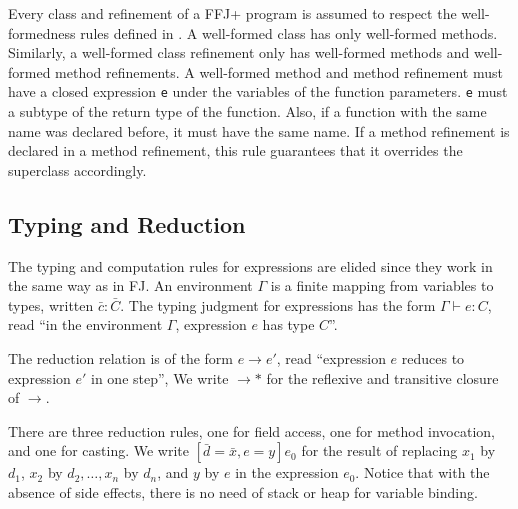 Every class and refinement of a \gls{FFJ+} program is assumed to respect the well-formedness rules
defined in .
A well-formed class has only well-formed methods. Similarly, a well-formed class refinement
only has well-formed methods and well-formed method refinements.
A well-formed method and method refinement must have a closed expression \texttt{e} under 
the variables of the function parameters. \texttt{e} must a subtype of the return
type of the function. Also, if a function with the same name was declared before, 
it must have the same name. If a method refinement is declared in a method refinement,
this rule guarantees that it overrides the superclass accordingly.

\subsection{Typing and Reduction}
The typing and computation rules for expressions are elided since they work in the same way as in \ac{FJ}. 
An environment $\Gamma$ is a finite mapping from variables to types, written $\bar{c}:\bar{C}$.
The typing judgment for expressions has the form $\Gamma \vdash e: C$, read ``in
the environment $\Gamma$, expression $e$ has type $C$''.

The reduction relation is of the form $e \rightarrow e'$, read ``expression
$e$ reduces to expression $e'$ in one step'', We write $\rightarrow *$ for the
reflexive and transitive closure of $\rightarrow$.

There are three reduction rules, one for field access, one for method invocation, and one for casting.
We write $[\bar{d}=\bar{x}, e=y]e_0$ for
the result of replacing $x_1$ by $d_1$, $x_2$ by $d_2, \dots, x_n$ by $d_n$, and $y$ by $e$ in
the expression $e_0$.
Notice that with the absence of side effects, there is no need of stack
or heap for variable binding. 